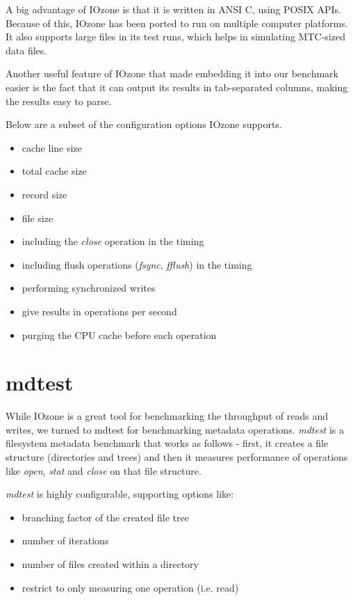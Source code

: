 A big advantage of IOzone is that it is written in ANSI C, using POSIX APIs. Because of this, IOzone has been ported to run on multiple computer platforms. It also supports large files in its test runs, which helps in simulating MTC-sized data files.

Another useful feature of IOzone that made embedding it into our benchmark easier is the fact that it can output its results in tab-separated columns, making the results easy to parse.

Below are a subset of the configuration options IOzone supports.

\begin{itemize}

\item cache line size
\item total cache size
\item record size
\item file size
\item including the \textit{close} operation in the timing
\item including flush operations (\textit{fsync}, \textit{fflush}) in the timing
\item performing synchronized writes
\item give results in operations per second
\item purging the CPU cache before each operation

\end{itemize}


\section{mdtest}

While IOzone is a great tool for benchmarking the throughput of reads and writes, we turned to mdtest for benchmarking metadata operations. \textit{mdtest}\cite{mdtest} is a filesystem metadata benchmark that works as follows - first, it creates a file structure (directories and trees) and then it measures performance of operations like \textit{open}, \textit{stat} and \textit{close} on that file structure.

\textit{mdtest} is highly configurable, supporting options like:

\begin{itemize}

\item branching factor of the created file tree
\item number of iterations
\item number of files created within a directory
\item restrict to only measuring one operation (i.e. read)

\end{itemize}

